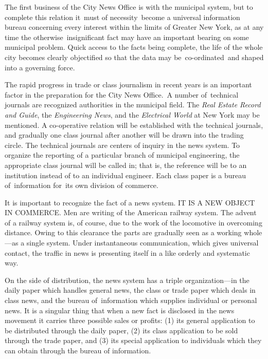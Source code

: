 \documentclass[twoside,symmetric,nobib,justified]{tufte-book}
\begin{document}
\enlargethispage{\baselineskip}

The first business of the City News Office is with the municipal system,
but to complete this relation it~must of necessity~become a universal
information bureau concerning every interest within the limits of
Greater New York, as at any time the otherwise~insignificant fact may
have an important bearing on some municipal problem. Quick access to the
facts being complete, the life of the whole city becomes clearly
objectified so that the data may be~co-ordinated~and shaped into a
governing force.~

The rapid progress in trade or class journalism in recent years is an
important factor in the preparation for the City News Office.~A number
of~technical journals are recognized authorities in the municipal field.
The\emph{ Real Estate Record and Guide}, the \emph{Engineering News},
and the \emph{Electrical World} at New York may be mentioned. A
co-operative relation will be established with the technical journals,
and gradually one class journal after another will be drawn into the
trading circle. The technical journals are centers of inquiry in the
news system. To organize the reporting of a particular branch of
municipal engineering, the appropriate class journal will be called in;
that is, the reference will be to an institution instead of to an
individual engineer. Each class paper is a bureau of~information for~its
own division of commerce.~

It is important to recognize the fact of a news system. IT IS A NEW
OBJECT IN COMMERCE. Men are writing of the American railway system. The
advent of a railway system is, of course, due to the work of the
locomotive in overcoming distance. Owing to this clearance the parts are
gradually seen as a working whole---as a single system. Under
instantaneous communication, which gives universal contact, the traffic
in news is presenting itself in a like orderly and systematic way.~~

On the side of distribution, the news system has a triple
organization---in the daily paper which handles general news, the class
or trade paper which deals in class news, and the bureau of~information
which supplies individual or personal news. It is a singular thing that
when a new fact is disclosed in the news movement it carries three
possible sales or profits: (1) its general application to be distributed
through the daily paper, (2) its class application to be sold through
the trade paper, and (3) its special application to individuals which
they can obtain through the bureau of information.~
\end{document}
